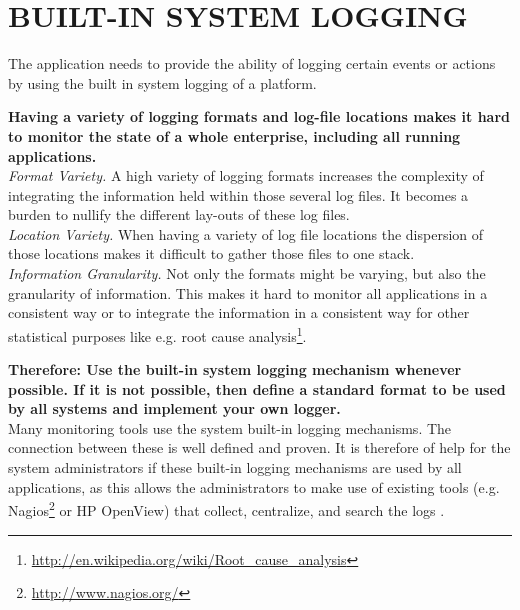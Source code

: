 \newpage
\section*{BUILT-IN SYSTEM LOGGING}

The application needs to provide the ability of logging certain events or actions by using the built in system logging of a platform. 

\begin{center}
  
\end{center}

\textbf{Having a variety of logging formats and log-file locations makes it hard to monitor the state of a whole enterprise, including all running applications.}\\

\textit{Format Variety.} A high variety of logging formats increases the complexity of integrating the information held within those several log files. It becomes a burden to nullify the different lay-outs of these log files.\\ 

\textit{Location Variety.} When having a variety of log file locations the dispersion of those locations makes it difficult to gather those files to one stack.\\

\textit{Information Granularity.} Not only the formats might be varying, but also the granularity of information. This makes it hard to monitor all applications in a consistent way or to integrate the information in a consistent way for other statistical purposes like e.g. root cause analysis\footnote{\url{http://en.wikipedia.org/wiki/Root_cause_analysis}}.

\begin{center}
   
\end{center}

\textbf{Therefore: Use the built-in system logging mechanism whenever possible. If it is not possible, then define a standard format to be used by all systems and implement your own logger.}\\

Many monitoring tools use the system built-in logging mechanisms. The connection between these is well defined and proven. It is therefore of help for the system administrators if these built-in logging mechanisms are used by all applications, as this allows the administrators to make use of existing tools (e.g. Nagios\footnote{\url{http://www.nagios.org/}} or HP OpenView) that collect, centralize, and search the logs \cite{Limoncelli2011a}.

